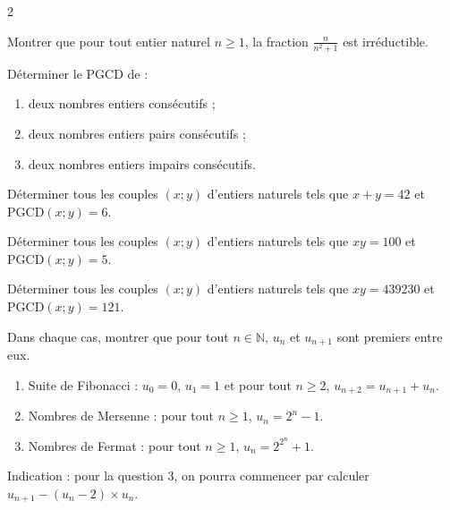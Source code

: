 \documentclass[a4paper,12pt]{article}
\begin{document}
\begin{multicols}{2}
    \begin{exercice}[title=Exercice 11 $\quad \star \star \quad$ { [Calculer, Raisonner, Chercher] }]{}{}
    Montrer que pour tout entier naturel $n \geq 1$, la fraction $\frac{n}{n^2 + 1}$ est irréductible.
    \end{exercice}
    
    \begin{exercice}[title=Exercice 12 $\quad \star \star \quad$ { [Représenter, Raisonner] }]{}{}
    Déterminer le PGCD de :
    \begin{enumerate}
        \item deux nombres entiers consécutifs ;
        \item deux nombres entiers pairs consécutifs ;
        \item deux nombres entiers impairs consécutifs.
    \end{enumerate}
    \end{exercice}
    
    \begin{exercice}[title=Exercice 13 $\quad \star \star \quad$ { [Calculer, Chercher] }]{}{}
    Déterminer tous les couples $(x ; y)$ d'entiers naturels tels que $x + y = 42$ et $\text{PGCD}(x ; y) = 6$.
    \end{exercice}
    
    \begin{exercice}[title=Exercice 14 $\quad \star \star \quad$ { [Calculer, Chercher] }]{}{}
    Déterminer tous les couples $(x ; y)$ d'entiers naturels tels que $xy = 100$ et $\text{PGCD}(x ; y) = 5$.
    \end{exercice}
    
    \begin{exercice}[title=Exercice 15 $\quad \star \star \quad$ { [Calculer, Chercher] }]{}{}
    Déterminer tous les couples $(x ; y)$ d'entiers naturels tels que $xy = 439230$ et $\text{PGCD}(x ; y) = 121$.
    \end{exercice}
    
    \begin{exercice}[title=Exercice 16 $\quad \star \star \star \quad$ { [Calculer, Chercher] }]{}{}
    Dans chaque cas, montrer que pour tout $n \in \mathbb{N}$, $u_n$ et $u_{n+1}$ sont premiers entre eux.
    \begin{enumerate}
        \item Suite de Fibonacci : $u_0 = 0$, $u_1 = 1$ et pour tout $n \geq 2$, $u_{n+2} = u_{n+1} + u_n$.
        \item Nombres de Mersenne : pour tout $n \geq 1$, $u_n = 2^n - 1$.
        \item Nombres de Fermat : pour tout $n \geq 1$, $u_n = 2^{2^n} + 1$.
    \end{enumerate}
    Indication : pour la question 3, on pourra commencer par calculer $u_{n+1} - (u_n - 2) \times u_n$.
    \end{exercice}
    

\end{multicols}
\end{document}
